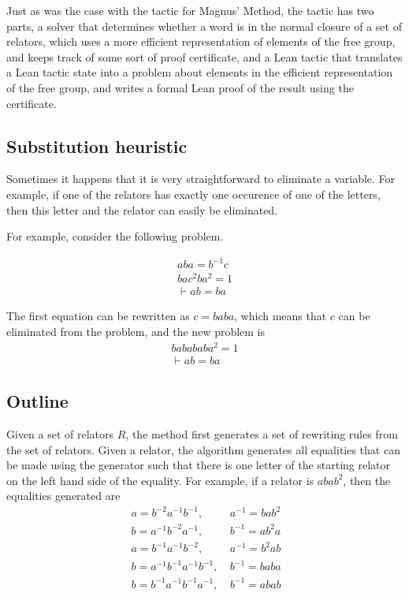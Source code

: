 \documentclass[12pt]{article} %
\theoremstyle{definition}
\theoremstyle{definition}
\theoremstyle{definition}
\theoremstyle{definition}
\begin{document}
  Just as was the case with the tactic for Magnus' Method, the tactic has two parts,
  a solver that determines whether a word is in the normal closure of a set of relators,
  which uses a more efficient representation of elements of the free group, and keeps track
  of some sort of proof certificate, and a Lean tactic that translates a Lean tactic state
  into a problem about elements in the efficient representation of the free group, and
  writes a formal Lean proof of the result using the certificate.

\subsection{Substitution heuristic}\label{subst}
  Sometimes it happens that it is very straightforward to eliminate a variable.
  For example, if one of the relators has exactly one occurence of one of the
  letters, then this letter and the relator can easily be eliminated.

  For example, consider the following problem.

  \begin{equation}
    \begin{aligned}
      aba =b^{-1}c \\
      bac^2ba^2 = 1 \\
      \vdash ab=ba
    \end{aligned}
  \end{equation}

The first equation can be rewritten as $c = baba$, which means that $c$ can be eliminated
from the problem, and the new problem is
\begin{equation}
  \begin{aligned}
    babababa^2 = 1 \\
    \vdash ab=ba
  \end{aligned}
\end{equation}

\subsection{Outline}

  Given a set of relators $R$, the method first generates a set of rewriting rules
  from the set of relators. Given a relator, the algorithm generates all equalities
  that can be made using the generator such that there is one letter of the starting
  relator on the left hand side of the equality.
  For example, if a relator is $abab^2$, then the equalities generated are
  \begin{equation}\
    \begin{aligned}
      a = b^{-2}a^{-1}b^{-1}, \ & a^{-1} = bab^2 \\
      b = a^{-1}b^{-2}a^{-1},\ & b^{-1} = ab^2a \\
      a=b^{-1}a^{-1}b^{-2}, \ & a^{-1}=b^2ab \\
      b=a^{-1}b^{-1}a^{-1}b^{-1}, \  & b^{-1} = baba \\
      b=b^{-1}a^{-1}b^{-1}a^{-1}, \ & b^{-1} = abab
    \end{aligned}
  \end{equation}
\end{document}

